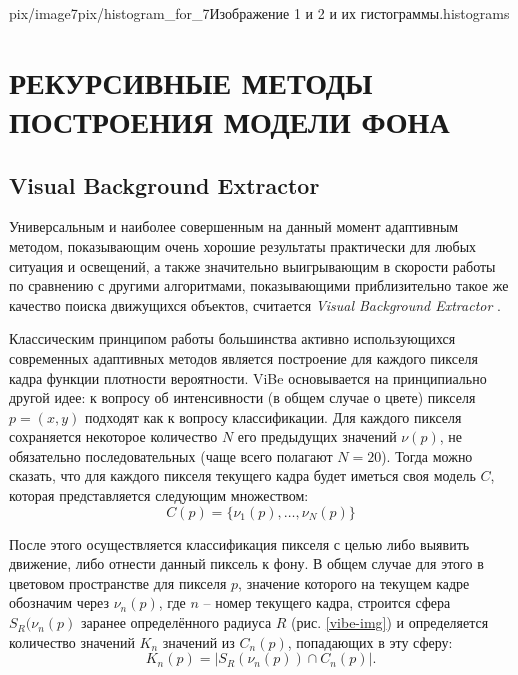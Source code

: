 {pix/image7}{pix/histogram_for_7}{Изображение 1 и 2
и их гистограммы.}{histograms}

\newpage


\newpage

\section{\nohyphens{РЕКУРСИВНЫЕ МЕТОДЫ ПОСТРОЕНИЯ МОДЕЛИ ФОНА}}

\subsection{Visual Background Extractor}

Универсальным и наиболее совершенным на данный момент адаптивным методом,
показывающим очень хорошие результаты практически для любых ситуация и
освещений, а также значительно выигрывающим в скорости работы по сравнению с
другими алгоритмами, показывающими приблизительно такое же качество поиска
движущихся объектов, считается {\it Visual Background Extractor} 
\cite{van-vibe}.

Классическим принципом работы большинства активно использующихся современных 
адаптивных методов является построение для каждого пикселя кадра функции
плотности вероятности. ViBe основывается на принципиально другой идее:
к вопросу об интенсивности (в общем случае о цвете) пикселя $p=(x,y)$ 
подходят как к вопросу классификации. Для каждого пикселя сохраняется 
некоторое количество $N$ его предыдущих значений $\nu(p)$, не обязательно
последовательных (чаще всего полагают $N=20$). Тогда можно сказать, что для
каждого пикселя текущего кадра будет иметься своя модель $C$, которая
представляется следующим множеством:
\begin{equation}
 C(p)=\{ \nu_1(p), \ldots, \nu_N(p) \}
 \label{vibe-equat1}
\end{equation}

После этого осуществляется классификация пикселя с целью либо выявить движение,
либо отнести данный пиксель к фону. В общем случае для этого в цветовом 
пространстве для пикселя $p$, значение которого на текущем кадре обозначим
через $\nu_n(p)$, где $n$ -- номер текущего кадра, строится сфера
$S_R(\nu_n(p)$ заранее определённого радиуса $R$ (рис. \ref{vibe-img}) и
определяется количество значений $K_n$ значений из $C_n(p)$, попадающих
в эту сферу:
\begin{equation}
	K_n(p)= |S_R(\nu_n(p)) \cap C_n(p)|.
	\label{vibe-equat-2}
\end{equation}

